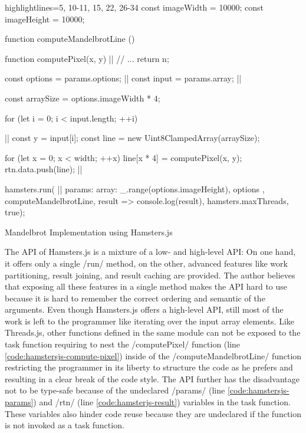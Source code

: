 \begin{listing}
\begin{javascriptcode*}{highlightlines={5, 10-11, 15, 22, 26-34}}
const imageWidth = 10000;
const imageHeight = 10000;

function computeMandelbrotLine () {
	function computePixel(x, y) {|$\label{code:hamstersjs-compute-pixel}$|
		// ...
		return n;
	}

	const options = params.options; |$\label{code:hamstersjs-params}$|
	const input = params.array; |$\label{code:hamstersjs-params-two}$|

	const arraySize = options.imageWidth * 4;

	for (let i = 0; i < input.length; ++i) {|$\label{code:hamsterjs-iterate}$|
		const y = input[i];
		const line = new Uint8ClampedArray(arraySize);
		
		for (let x = 0; x < width; ++x) {
			line[x * 4] = computePixel(x, y);
		}
		rtn.data.push(line); |$\label{code:hamsterjs-result}$|
	}
}

hamsters.run( |$\label{code:hamsterjs-start}$|
	params: {
		array: _.range(options.imageHeight),
		options
	},  
	computeMandelbrotLine, 
	result => console.log(result), 
	hamsters.maxThreads, 
	true);
\end{javascriptcode*}
\caption{Mandelbrot Implementation using Hamsters.js}
\label{fig:mandelbrot-hamsterjs}
\end{listing}

The API of Hamsters.js is a mixture of a low- and high-level API: On one hand, it offers only a single \javascriptinline/run/ method, on the other, advanced features like work partitioning, result joining, and result caching are provided. The author believes that exposing all these features in a single method makes the API hard to use because it is hard to remember the correct ordering and semantic of the arguments. Even though Hamsters.js offers a high-level API, still most of the work is left to the programmer like iterating over the input array elements. Like Threads.js, other functions defined in the same module can not be exposed to the task function requiring to nest the \javascriptinline/computePixel/ function (line \ref{code:hamstersjs-compute-pixel}) inside of the \javascriptinline/computeMandelbrotLine/ function restricting the programmer in its liberty to structure the code as he prefers and resulting in a clear break of the code style. The API further has the disadvantage not to be type-safe because of the undeclared \javascriptinline/params/ (line \ref{code:hamstersjs-params}) and \javascriptinline/rtn/ (line \ref{code:hamsterjs-result}) variables in the task function. These variables also hinder code reuse because they are undeclared if the function is not invoked as a task function.

